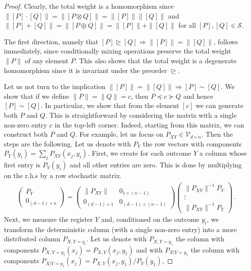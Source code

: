 \documentclass[10pt,a4paper]{amsart}
\newcommand{\V}{\mathcal{V}}
\newcommand{\cS}{\mathcal{S}}
\newcommand{\rgeq}{\trianglerighteq}
\begin{document}
\begin{proof}
Clearly, the total weight is a homomorphism since $\|[P]\cdot [Q]\|=\|[P\otimes Q]\|=\|[P]\|\|[Q]\|$ and $\|[P]+[Q]\|=\|[P\oplus Q]\|=\|[P]\|+\|[Q]\|$ for all $[P],[Q]\in\cS$. 

The first direction, namely that $[P] \rgeq [Q] \Rightarrow \|[P]\| = \|[Q]\|$, follows immediately, since conditionally mixing operations preserve the total weight $\|P\|$ of any element $P$. This also shows that the total weight is a degenerate homomorphism since it is invariant under the preorder $\rgeq$.

Let us not turn to the implication $\|[P]\|=\|[Q]\|\Rightarrow [P]\sim [Q]$.  We show that if we define $\|P\|=\|Q\| = c$, then $P\preceq c\succeq Q$ 
and hence $[P]\sim [Q]$. In particular, we show that from the element $[c]$ we can generate both $P$ and $Q$. This is straightforward by considering the matrix with a single non-zero entry $c$ in the top-left corner. Indeed, starting from this matrix, we can construct both $P$ and $Q$. For example, let us focus on $P_{XY} \in \V_{d\times n}$.
Then the steps are the following. Let us denote with $P_{Y}$ the row vectors with components $P_Y(y_i) = \sum_jP_{XY}(x_j,y_i)$. 
First, we create for each outcome $Y$ a column whose first entry is $P_Y(y_i)$ and all other entries are zero. This is done by multiplying on the r.h.s by a row stochastic matrix.
\begin{align}
\begin{pmatrix}
     P_{Y} \\
    0_{(d-1) \times n}   
\end{pmatrix}=
\begin{pmatrix}
    \|P_{XY}\| & 0_{1\times (n-1)} \\
    0_{(d-1)\times 1} & 0_{(d-1)\times (n-1)}
\end{pmatrix} 
\begin{pmatrix}
    \|P_{XY}\|^{-1} P_{Y} \\
    \vdots \\
    \|P_{XY}\|^{-1} P_{Y}    
\end{pmatrix}\,.
\end{align}
Next, we measure the register $Y$ and, conditioned on the outcome $y_i$, we transform the deterministic column (with a single non-zero entry) into a more distributed column $P_{X,Y=y_i}$. Let us denote with $P_{X,Y=y_1}$ the column with components $P_{X,Y=y_1}(x_j)=P_{X,Y}(x_j,y_1)$ and with $P_{X|Y=y_1}$ the column with components $P_{X|Y=y_1}(x_j)=P_{X,Y}(x_j,y_1)/P_Y(y_1)$,

\end{proof}
\end{document}

